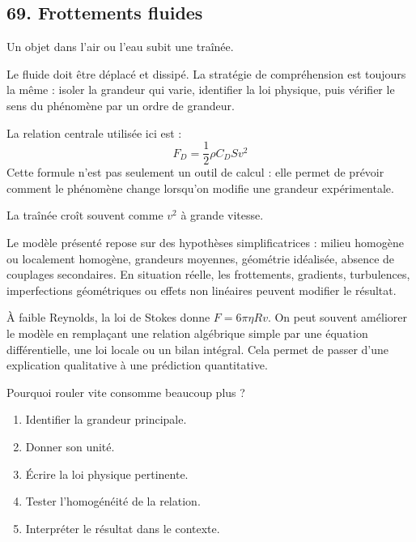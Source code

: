 \documentclass[11pt,a4paper]{article}
\begin{document}
\subsection{69. Frottements fluides}

\begin{exemplebox}
Un objet dans l'air ou l'eau subit une traînée.
\end{exemplebox}

\begin{methodebox}
Le fluide doit être déplacé et dissipé.
La stratégie de compréhension est toujours la même : isoler la grandeur qui varie, identifier la loi physique, puis vérifier le sens du phénomène par un ordre de grandeur.
\end{methodebox}

\begin{theorembox}
La relation centrale utilisée ici est :
\[
F_D=\frac12\rho C_D S v^2
\]
Cette formule n'est pas seulement un outil de calcul : elle permet de prévoir comment le phénomène change lorsqu'on modifie une grandeur expérimentale.
\end{theorembox}

\begin{odgbox}
La traînée croît souvent comme $v^2$ à grande vitesse.
\end{odgbox}

\begin{attentionbox}
Le modèle présenté repose sur des hypothèses simplificatrices : milieu homogène ou localement homogène, grandeurs moyennes, géométrie idéalisée, absence de couplages secondaires. En situation réelle, les frottements, gradients, turbulences, imperfections géométriques ou effets non linéaires peuvent modifier le résultat.
\end{attentionbox}

\begin{approfondissementbox}
À faible Reynolds, la loi de Stokes donne $F=6\pi\eta Rv$.
On peut souvent améliorer le modèle en remplaçant une relation algébrique simple par une équation différentielle, une loi locale ou un bilan intégral. Cela permet de passer d'une explication qualitative à une prédiction quantitative.
\end{approfondissementbox}

\begin{exercicebox}
Pourquoi rouler vite consomme beaucoup plus ?
\begin{enumerate}
  \item Identifier la grandeur principale.
  \item Donner son unité.
  \item Écrire la loi physique pertinente.
  \item Tester l'homogénéité de la relation.
  \item Interpréter le résultat dans le contexte.
\end{enumerate}
\end{exercicebox}
\end{document}
